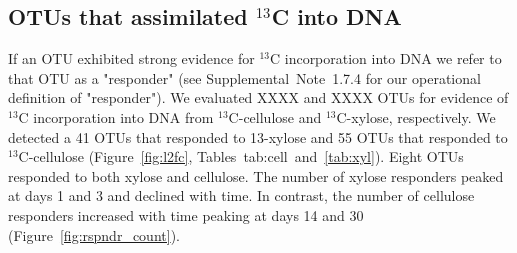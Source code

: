 \subsection{OTUs that assimilated $^{13}$C into DNA} \label{responders}
If an OTU exhibited strong evidence for $^{13}$C incorporation into DNA we
refer to that OTU as a "responder" (see Supplemental Note 1.7.4 for our
operational definition of "responder"). We evaluated XXXX and XXXX OTUs for
evidence of $^{13}$C incorporation into DNA from $^{13}$C-cellulose and
$^{13}$C-xylose, respectively. We detected a 41 OTUs that responded to
13-xylose and 55 OTUs that responded to $^{13}$C-cellulose (Figure~\ref{fig:l2fc}, 
Tables~{tab:cell}~and~\ref{tab:xyl}). Eight OTUs responded to both xylose and
cellulose. The number of xylose responders peaked at days 1 and 3 and declined
with time. In contrast, the number of cellulose responders increased with time
peaking at days 14 and 30 (Figure~\ref{fig:rspndr_count}). 

